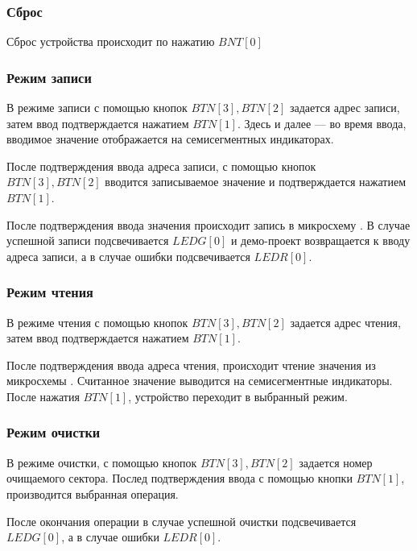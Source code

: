 \subsubsection{Сброс}
\par{Сброс устройства происходит по нажатию $BNT[0]$}
\subsubsection{Режим записи}
\par{В режиме записи с помощью кнопок $BTN[3], BTN[2]$ задается адрес записи, затем ввод подтверждается нажатием $BTN[1]$. Здесь и далее --- во время ввода, вводимое значение отображается на семисегментных индикаторах.}
\par{После подтверждения ввода адреса записи, с помощью кнопок $BTN[3], BTN[2]$ вводится записываемое значение и подтверждается нажатием $BTN[1]$.}
\par{После подтверждения ввода значения происходит запись в микросхему . В случае успешной записи подсвечивается $LEDG[0]$ и демо-проект возвращается к вводу адреса записи, а в случае ошибки подсвечивается $LEDR[0]$.}

\pagebreak
\subsubsection{Режим чтения}
\par{В режиме чтения с помощью кнопок $BTN[3], BTN[2]$ задается адрес чтения, затем ввод подтверждается нажатием $BTN[1]$.}

\par{После подтверждения ввода адреса чтения, происходит чтение значения из микросхемы . Считанное значение выводится на семисегментные индикаторы. После нажатия $BTN[1]$, устройство переходит в выбранный режим.}

\subsubsection{Режим очистки}
\par{В режиме очистки, с помощью кнопок $BTN[3], BTN[2]$ задается номер очищаемого сектора. Послед подтверждения ввода с помощью кнопки $BTN[1]$, производится выбранная операция.}
\par{После окончания операции в случае успешной очистки подсвечивается $LEDG[0]$, а в случае ошибки $LEDR[0]$.}



